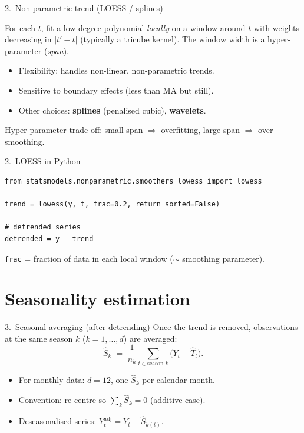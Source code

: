 \documentclass[aspectratio=169]{beamer}
\begin{document}
\begin{frame}{2.~Non-parametric trend (LOESS / splines)}
  \begin{defbox}
    For each $t$, fit a low-degree polynomial \emph{locally} on a
    window around $t$ with weights decreasing in $|t' - t|$ (typically
    a tricube kernel). The window width is a hyper-parameter (\emph{span}).
  \end{defbox}
  \medskip
  \begin{itemize}
    \item Flexibility: handles non-linear, non-parametric trends.
    \item Sensitive to boundary effects (less than MA but still).
    \item Other choices: \textbf{splines} (penalised cubic), \textbf{wavelets}.
  \end{itemize}
  \medskip
  \begin{warnbox}
    Hyper-parameter trade-off: small span $\Rightarrow$ overfitting,
    large span $\Rightarrow$ over-smoothing.
  \end{warnbox}
\end{frame}

\begin{frame}[fragile]{2.~LOESS in Python}
\begin{lstlisting}
from statsmodels.nonparametric.smoothers_lowess import lowess

trend = lowess(y, t, frac=0.2, return_sorted=False)

# detrended series
detrended = y - trend
\end{lstlisting}
  \medskip
  \texttt{frac} = fraction of data in each local window
  ($\sim$ smoothing parameter).
\end{frame}

\section{Seasonality estimation}

\begin{frame}{3.~Seasonal averaging (after detrending)}
  Once the trend is removed, observations at the same season $k$
  ($k = 1, \dots, d$) are averaged:
  \[
    \widehat{S}_k \;=\; \frac{1}{n_k}\sum_{t \in \text{season } k}
                    \bigl(Y_t - \widehat{T}_t\bigr).
  \]
  \medskip
  \begin{itemize}
    \item For monthly data: $d = 12$, one $\widehat{S}_k$ per calendar
          month.
    \item Convention: re-centre so $\sum_k \widehat{S}_k = 0$
          (additive case).
    \item Deseasonalised series:
          $Y_t^{\text{adj}} = Y_t - \widehat{S}_{k(t)}$.
  \end{itemize}
\end{frame}
\end{document}
